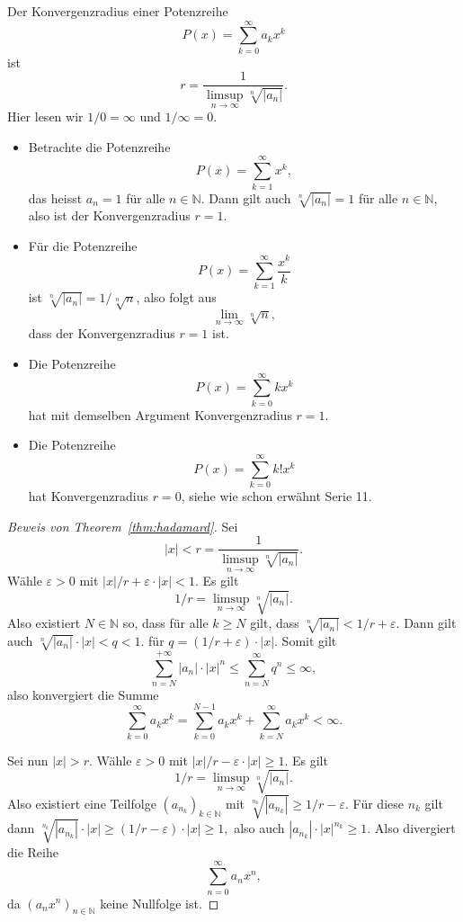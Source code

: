 \documentclass[../main.tex]{subfiles}
\begin{document}
\begin{theorem}\label{thm:hadamard}
  Der Konvergenzradius einer Potenzreihe
  \[
    P(x) = \sum_{k=0}^{\infty} a_k x^k
  \]
  ist
  \[
    r = \frac{1}{\limsup_{n \to \infty} \sqrt[n]{|a_n|}}.
  \]
  Hier lesen wir $1/0 = \infty$ und $1/\infty = 0$.
\end{theorem}

\begin{examples}
  \leavevmode
  \begin{itemize}
    \item Betrachte die Potenzreihe
      \[
        P(x) = \sum_{k=1}^{\infty} x^k,
      \]
      das heisst $a_n = 1$ für alle $n \in \mathbb{N}$.
      Dann gilt auch $\sqrt[n]{|a_n|} = 1$ für alle $n \in \mathbb{N}$,
      also ist der Konvergenzradius $r = 1$.
    \item Für die Potenzreihe
      \[
        P(x) = \sum_{k=1}^{\infty} \frac{x^k}{k}
      \]
      ist $\sqrt[n]{|a_n|} = 1/\sqrt[n]{n}$, also folgt aus
      \[
        \lim_{n \to \infty} \sqrt[n]{n},
      \]
      dass der Konvergenzradius $r = 1$ ist.
    \item Die Potenzreihe
      \[
        P(x) = \sum_{k=0}^{\infty} k x^k
      \]
      hat mit demselben Argument Konvergenzradius $r = 1$.
    \item Die Potenzreihe
      \[
        P(x) = \sum_{k=0}^{\infty} k! x^k
      \]
      hat Konvergenzradius $r = 0$, siehe wie schon erwähnt Serie 11.
  \end{itemize}
\end{examples}

\begin{proof}[Beweis von Theorem~\ref{thm:hadamard}]
  Sei \[|x| < r = \frac{1}{\limsup_{n \to \infty} \sqrt[n]{|a_n|}}.\]
  Wähle $\varepsilon > 0$ mit $|x|/r + \varepsilon \cdot |x| < 1$.
  Es gilt
  \[
    1/r = \limsup_{n \to \infty} \sqrt[n]{|a_n|}.
  \]
  Also existiert $N \in \mathbb{N}$ so, dass für alle $k \geq N$ gilt, dass
  \(
    \sqrt[n]{|a_n|} < 1/r + \varepsilon.
  \)
  Dann gilt auch
  \(
    \sqrt[n]{|a_n|} \cdot |x| < q < 1.
  \)
  für
  \(
    q = (1/r + \varepsilon) \cdot |x|.
  \)
  Somit gilt
  \[
    \sum_{n=N}^{+\infty} |a_n| \cdot |x|^n \leq \sum_{n=N}^{\infty} q^n \leq \infty,
  \]
  also konvergiert die Summe
  \[
    \sum_{k=0}^{\infty} a_k x^k = \sum_{k=0}^{N-1} a_k x^k + \sum_{k=N}^{\infty} a_k x^k < \infty.
  \]
  
  Sei nun $|x| > r$. Wähle $\varepsilon > 0$ mit $|x|/r - \varepsilon \cdot |x| \geq 1$.
  Es gilt
   \[
     1/r = \limsup_{n \to \infty} \sqrt[n]{|a_n|}.
  \]
  Also existiert eine Teilfolge ${(a_{n_k})}_{k \in \mathbb{N}}$ mit
  \(
    \sqrt[n_k]{|a_{n_k}|} \geq 1/r - \varepsilon.
  \)
  Für diese $n_k$ gilt dann
  \(
    \sqrt[n_k]{|a_{n_k}|} \cdot |x| \geq (1/r -\varepsilon) \cdot |x| \geq 1,
  \)
  also auch $|a_{n_k}| \cdot |x|^{n_k} \geq 1$. Also divergiert die Reihe
  \[
    \sum_{n=0}^{\infty} a_n x^n,
  \]
  da $ {(a_n x^n)}_{n \in \mathbb{N}}$ keine Nullfolge ist.
\end{proof}
\end{document}
